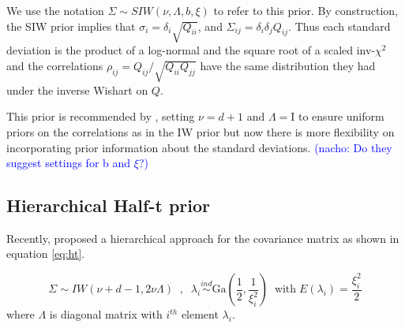 \documentclass[12pt]{article}
\newcommand{\nacho}[1]{\textcolor{blue}{(nacho: #1)}}
\newcommand{\I}{\mathrm{I}}
\begin{document}
We use the notation $\Sigma \sim SIW(\nu, \Lambda, b, \xi)$ to refer to this prior.  By construction, the SIW prior implies that $\sigma_i = \delta_i \sqrt{Q_{ii}}$, and $\Sigma_{ij}=\delta_i\delta_jQ_{ij}$. Thus each standard deviation is the product of a log-normal and the square root of a scaled inv-$\chi^2$ and the correlations $\rho_{ij} = Q_{ij}/\sqrt{Q_{ii}Q_{jj}}$ have the same distribution they had under the inverse Wishart on $Q$.  


This prior is recommended by \cite{gelmanhill}, setting $\nu=d+1$ and $\Lambda=\I$ to ensure uniform priors on the correlations as in the IW prior but now there is more flexibility on incorporating prior information about the standard deviations. \nacho{Do they suggest settings for b and $\xi$?}

\subsection{Hierarchical Half-t prior}

Recently, \cite{huang2013simple} proposed a hierarchical approach for the covariance matrix as shown in equation \eqref{eq:ht}. 

\begin{equation}
\Sigma \sim IW( \nu + d - 1 ,  2\nu\Lambda) \;\;,\;\;  \lambda_i  \stackrel{ind} \sim \mbox{Ga}\left(\frac{1}{2} , \frac{1}{\xi_i^2}\right) \;\; \mbox{with} \; E(\lambda_i)=\frac{\xi_i^2}{2} 
\label{eq:ht}
\end{equation} 
where $\Lambda$ is diagonal matrix with $i^{th}$ element $\lambda_i$. 
\end{document}
